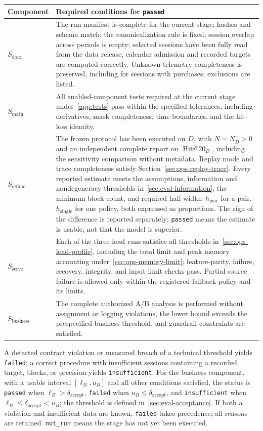 \documentclass[12pt,a4paper]{article}
\newcommand{\code}[1]{{\ttfamily\small\nolinkurl{#1}}}
\theoremstyle{plainru}
\begin{document}
\begin{longtable}{L{0.16\textwidth}L{0.73\textwidth}}
\toprule Component & Required conditions for \code{passed} \\\midrule\endhead
$S_{\mathrm{data}}$ & The run manifest is complete for the current stage; hashes and schema
match; the canonicalization rule is fixed; session overlap across periods
is empty; selected sessions have been fully read from the data release, calendar
admission and recorded targets are computed correctly. Unknown telemetry
completeness is preserved, including for sessions with purchases; exclusions are listed. \\
$S_{\mathrm{math}}$ & All enabled-component tests required
at the current stage under~\ref{app:tests} pass within the specified tolerances, including derivatives,
mask completeness, time boundaries, and the hit-loss identity. \\
$S_{\mathrm{offline}}$ & The frozen protocol has been executed on $D$, with
$N=N_D^+>0$ and an independent complete report on $\operatorname{Hit@20}_D$,
including the sensitivity comparison
without metadata. Replay mode and trace completeness satisfy
Section~\ref{sec:ops-replay-trace}. Every reported estimate
meets the assumptions, information and nondegeneracy thresholds
in~\ref{sec:eval-information}, the minimum block count, and required half-width:
$h_{\mathrm{pair}}$ for a pair, $h_{\mathrm{single}}$ for one policy,
both expressed as proportions.
The sign of the difference is reported separately: \code{passed} means the
estimate is usable, not that the model is superior. \\
$S_{\mathrm{serve}}$ & Each of the three load runs satisfies
all thresholds in~\ref{sec:ops-load-profile}, including the total limit and peak
memory accounting under~\ref{sec:ops-memory-limit}; feature-parity,
failure, recovery, integrity, and input-limit checks pass.
Partial source failure is allowed only within the registered
fallback policy and its limits. \\
$S_{\mathrm{business}}$ & The complete authorized A/B analysis is performed without
assignment or logging violations, the lower bound exceeds the prespecified
business threshold, and guardrail constraints are satisfied. \\
\bottomrule
\end{longtable}
A detected contract violation or measured breach of a
technical threshold yields \code{failed}; a correct procedure
with insufficient sessions containing a recorded target, blocks, or precision yields \code{insufficient}.
For the business component, with a usable interval $[\ell_B,u_B]$ and all
other conditions satisfied, the status is \code{passed} when
$\ell_B>\delta_{\mathrm{accept}}$, \code{failed} when
$u_B\le\delta_{\mathrm{accept}}$, and \code{insufficient} when
$\ell_B\le\delta_{\mathrm{accept}}<u_B$;
the threshold is defined in~\ref{sec:eval-acceptance}. If both
a violation and insufficient data are known, \code{failed} takes precedence;
all reasons are retained.
\code{not_run} means the stage has not yet been executed.
\end{document}
